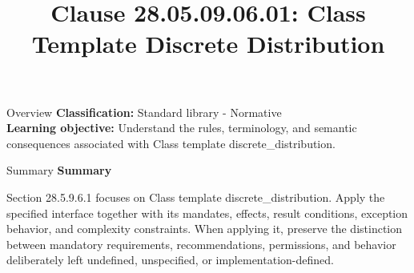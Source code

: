 \documentclass[10pt,letterpaper]{article}
\title{Clause 28.05.09.06.01: Class Template Discrete Distribution}
\author{}
\date{}
\begin{document}
\maketitle
\begin{CornellOverviewBox}{Overview}
\textbf{Classification:} Standard library - Normative\\[2pt]
\textbf{Learning objective:} Understand the rules, terminology, and semantic consequences associated with Class template discrete\_distribution.
\end{CornellOverviewBox}\begin{CornellSummaryBox}{Summary}
{\sffamily\bfseries\color{Accent} Summary}\par\vspace{3pt}Section 28.5.9.6.1 focuses on Class template discrete\_distribution. Apply the specified interface together with its mandates, effects, result conditions, exception behavior, and complexity constraints. When applying it, preserve the distinction between mandatory requirements, recommendations, permissions, and behavior deliberately left undefined, unspecified, or implementation-defined.
\end{CornellSummaryBox}
\end{document}
